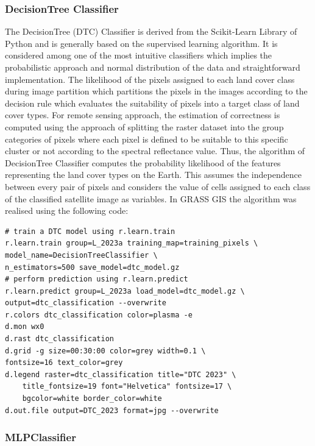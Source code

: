 \documentclass[eprint,
approc,		%
]{actapoly}
\begin{document}
\subsubsection{DecisionTree Classifier}

The DecisionTree (DTC) Classifier is derived from the Scikit-Learn Library of Python and is generally based on the supervised learning algorithm. It is considered among one of the most intuitive classifiers which implies the probabilistic approach and normal distribution of the data and straightforward implementation. The likelihood of the pixels assigned to each land cover class during image partition which partitions the pixels in the images according to the decision rule which evaluates the suitability of pixels into a target class of land cover types. For remote sensing approach, the estimation of correctness is computed using the approach of splitting the raster dataset into the group categories of pixels where each pixel is defined to be suitable to this specific cluster or not according to the spectral reflectance value. Thus, the algorithm of DecisionTree Classifier computes the probability likelihood of the features representing the land cover types on the Earth. This assumes the independence between every pair of pixels and considers the value of cells assigned to each class of the classified satellite image as variables. In GRASS GIS the algorithm was realised using the following code:

\begin{footnotesize}
\begin{verbatim}
# train a DTC model using r.learn.train
r.learn.train group=L_2023a training_map=training_pixels \
model_name=DecisionTreeClassifier \
n_estimators=500 save_model=dtc_model.gz
# perform prediction using r.learn.predict
r.learn.predict group=L_2023a load_model=dtc_model.gz \
output=dtc_classification --overwrite
r.colors dtc_classification color=plasma -e
d.mon wx0
d.rast dtc_classification
d.grid -g size=00:30:00 color=grey width=0.1 \
fontsize=16 text_color=grey
d.legend raster=dtc_classification title="DTC 2023" \
	title_fontsize=19 font="Helvetica" fontsize=17 \
	bgcolor=white border_color=white
d.out.file output=DTC_2023 format=jpg --overwrite
\end{verbatim}
\end{footnotesize}

\subsubsection{MLPClassifier}
\end{document}
